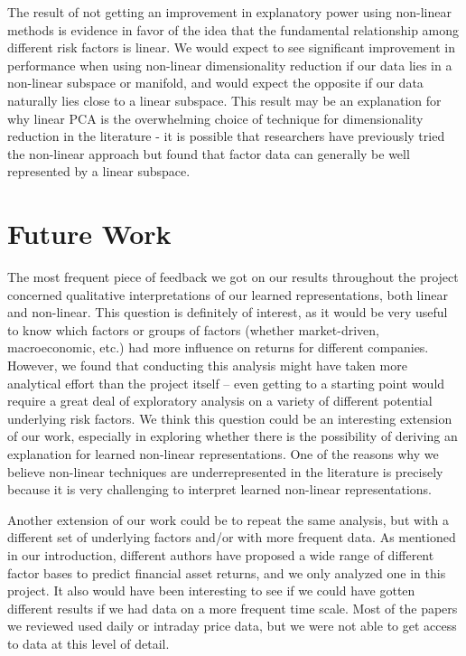 \documentclass[a4paper]{article}
\begin{document}
    \par The result of not getting an improvement in explanatory power using non-linear methods is evidence in favor of the idea that the fundamental relationship among different risk factors is linear. We would expect to see significant improvement in performance when using non-linear dimensionality reduction if our data lies in a non-linear subspace or manifold, and would expect the opposite if our data naturally lies close to a linear subspace. This result may be an explanation for why linear PCA is the overwhelming choice of technique for dimensionality reduction in the literature - it is possible that researchers have previously tried the non-linear approach but found that factor data can generally be well represented by a linear subspace.
    
    \section{Future Work}
    \par The most frequent piece of feedback we got on our results throughout the project concerned qualitative interpretations of our learned representations, both linear and non-linear. This question is definitely of interest, as it would be very useful to know which factors or groups of factors (whether market-driven, macroeconomic, etc.) had more influence on returns for different companies. However, we found that conducting this analysis might have taken more analytical effort than the project itself – even getting to a starting point would require a great deal of exploratory analysis on a variety of different potential underlying risk factors. We think this question could be an interesting extension of our work, especially in exploring whether there is the possibility of deriving an explanation for learned non-linear representations. One of the reasons why we believe non-linear techniques are underrepresented in the literature is precisely because it is very challenging to interpret learned non-linear representations.
    \par Another extension of our work could be to repeat the same analysis, but with a different set of underlying factors and/or with more frequent data. As mentioned in our introduction, different authors have proposed a wide range of different factor bases to predict financial asset returns, and we only analyzed one in this project. It also would have been interesting to see if we could have gotten different results if we had data on a more frequent time scale. Most of the papers we reviewed used daily or intraday price data, but we were not able to get access to data at this level of detail.
    
\end{document}
